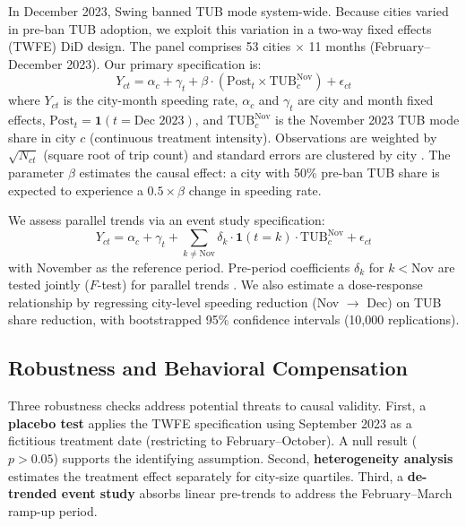 In December 2023, Swing banned TUB mode system-wide. Because cities varied in pre-ban TUB adoption, we exploit this variation in a two-way fixed effects (TWFE) DiD design. The panel comprises 53 cities $\times$ 11 months (February--December 2023). Our primary specification is:
\begin{equation}
    Y_{ct} = \alpha_c + \gamma_t + \beta \cdot (\text{Post}_t \times \text{TUB}^{\text{Nov}}_c) + \epsilon_{ct}
    \label{eq:twfe}
\end{equation}
where $Y_{ct}$ is the city-month speeding rate, $\alpha_c$ and $\gamma_t$ are city and month fixed effects, $\text{Post}_t = \mathbf{1}(t = \text{Dec 2023})$, and $\text{TUB}^{\text{Nov}}_c$ is the November 2023 TUB mode share in city $c$ (continuous treatment intensity). Observations are weighted by $\sqrt{N_{ct}}$ (square root of trip count) and standard errors are clustered by city \citep{arellano1987computing}. The parameter $\beta$ estimates the causal effect: a city with 50\% pre-ban TUB share is expected to experience a $0.5 \times \beta$ change in speeding rate.

We assess parallel trends via an event study specification:
\begin{equation}
    Y_{ct} = \alpha_c + \gamma_t + \sum_{k \neq \text{Nov}} \delta_k \cdot \mathbf{1}(t = k) \cdot \text{TUB}^{\text{Nov}}_c + \epsilon_{ct}
    \label{eq:event_study}
\end{equation}
with November as the reference period. Pre-period coefficients $\delta_k$ for $k < \text{Nov}$ are tested jointly ($F$-test) for parallel trends \citep{roth2022pretest}. We also estimate a dose-response relationship by regressing city-level speeding reduction (Nov $\rightarrow$ Dec) on TUB share reduction, with bootstrapped 95\% confidence intervals (10,000 replications).

\subsection{Robustness and Behavioral Compensation}
\label{sec:meth_robustness}

Three robustness checks address potential threats to causal validity. First, a \textbf{placebo test} applies the TWFE specification using September 2023 as a fictitious treatment date (restricting to February--October). A null result ($p > 0.05$) supports the identifying assumption. Second, \textbf{heterogeneity analysis} estimates the treatment effect separately for city-size quartiles. Third, a \textbf{de-trended event study} absorbs linear pre-trends to address the February--March ramp-up period.

